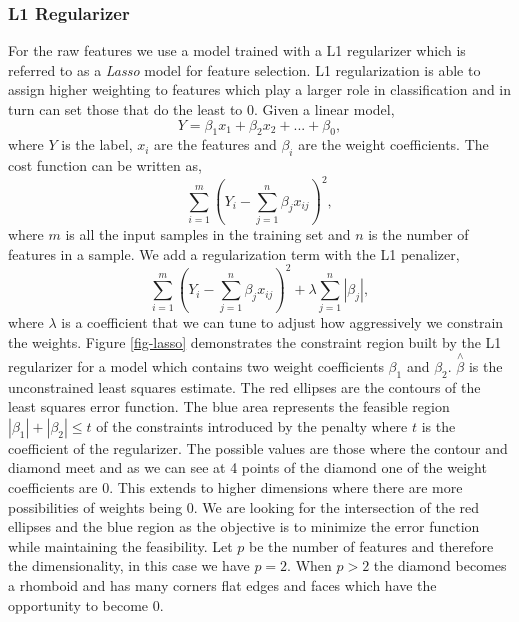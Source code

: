 \subsubsection{L1 Regularizer} For the raw features we use a model trained with a L1 regularizer which is referred to as a \emph{Lasso} model for feature selection. L1 regularization is able to assign higher weighting to features which play a larger role in classification and in turn can set those that do the least to 0. 
Given a linear model,
\begin{equation}
Y = \beta_{1}x_{1} + \beta_{2}x_{2} + ... + \beta_{0},
\end{equation}
where $Y$ is the label, $x_{i}$ are the features and $\beta_{i}$ are the weight coefficients.
The cost function can be written as,
\begin{equation}
\sum_{i=1}^{m}(Y_{i} - \sum_{j=1}^{n} \beta_{j}x_{ij})^{2},
\end{equation}
where $m$ is all the input samples in the training set and $n$ is the number of features in a sample.
We add a regularization term with the L1 penalizer,
\begin{equation}
        \sum_{i=1}^{m}(Y_{i} - \sum_{j=1}^{n} \beta_{j}x_{ij})^{2} + \lambda \sum_{j=1}^{n} |\beta_{j}|,
\end{equation}
where $\lambda$ is a coefficient that we can tune to adjust how aggressively we constrain the weights. Figure \ref{fig-lasso} demonstrates the constraint region built by the L1 regularizer for a model which contains two weight coefficients $\beta_{1}$ and $\beta_{2}$. $\overset{\wedge}{\beta}$ is the unconstrained least squares estimate. The red ellipses are the contours of the least squares error function. The blue area represents the feasible region $|\beta_{1}| + |\beta_{2}| \leq t$ of the constraints introduced by the penalty where $t$ is the coefficient of the regularizer. The possible values are those where the contour and diamond meet and as we can see  at 4 points of the diamond one of the weight coefficients are 0. This extends to higher dimensions where there are more possibilities of weights being 0. We are looking for the intersection of the red ellipses and the blue region as the objective is to minimize the error function while maintaining the feasibility. Let $p$ be the number of features and therefore the dimensionality, in this case we have $p = 2$. When $p > 2$ the diamond becomes a rhomboid and has many corners flat edges and faces which have the opportunity to become 0.
